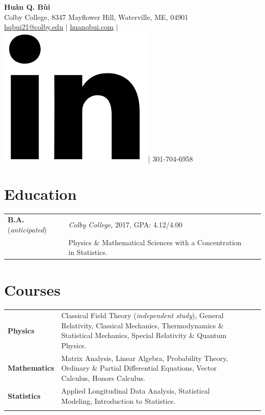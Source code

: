 \documentclass[a4paper, 10.5pt]{article}
\begin{document}
	\begin{center}
		{\LARGE\textbf{Hu\^{a}n Q. B\`{u}i}}\\
		\smallskip
		Colby College, 8347 Mayflower Hill, Waterville, ME, 04901\\ \href{mailto:hqbui21@colby.edu}{\underline{hqbui21@colby.edu}} $\vert$ \href{https://huanqbui.com}{\underline{huanqbui.com}} $\vert$ \href{https://www.linkedin.com/in/huan-bui/}{\includegraphics[scale=0.04]{linkedin_logo.PNG}} $\vert$ 301-704-6958
	\end{center}
	\section*{\normalsize{{\color{colby}Education}}}
		\begin{tabular}{lp{12.5cm}lp{8in}}
			\textbf{B.A.} (\textit{anticipated}) & \textit{Colby College}, 2017\textemdash 2021, GPA: 4.12/4.00\\ & Physics \& Mathematical Sciences with a Concentration in Statistics.\\
		\end{tabular}
	\section*{\normalsize{{\color{colby}Courses}}}
	\begin{tabular}{lp{13.5cm}lp{2in}}
		\textbf{Physics} 
		& Classical Field Theory (\textit{independent study}), General Relativity, Classical Mechanics, Thermodynamics \& Statistical Mechanics, Special Relativity \& Quantum Physics.\\
		
		\textbf{Mathematics} 
		&  Matrix Analysis, Linear Algebra, Probability Theory, Ordinary \& Partial Differential Equations, Vector Calculus, Honors Calculus.\\
		
		\textbf{Statistics}
		& Applied Longitudinal Data Analysis, Statistical Modeling, Introduction to Statistics.\\\\ 
	\end{tabular}
\end{document}
